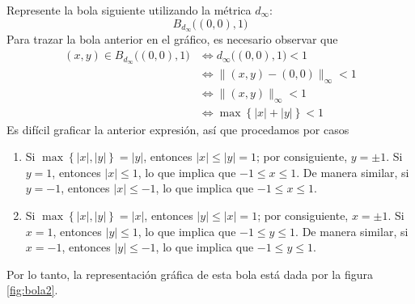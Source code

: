 \begin{example}
    Represente la bola siguiente utilizando la métrica $d_{\infty}$:
    $$B_{d_{\infty}} \big( (0, 0), 1 \big)$$\newpage{}
    \solucion Para trazar la bola anterior en el gráfico, es necesario observar que
    \begin{align*}
        (x, y) \in B_{d_{\infty}} \big( (0, 0), 1 \big) & \Longleftrightarrow d_{\infty} \big( (0, 0), 1 \big) < 1 \\
        & \Longleftrightarrow \| (x, y) - (0, 0) \|_{\infty} < 1 \\
        & \Longleftrightarrow \| (x, y) \|_{\infty} < 1 \\
        & \Longleftrightarrow \max \left\{ |x| + |y| \right\} < 1
    \end{align*}
    Es difícil graficar la anterior expresión, así que procedamos por casos
    \begin{enumerate}[label=\roman*)]
        \item Si $\max \left\{ |x|, |y| \right\} = |y|$, entonces $|x| \leq |y| = 1$; por consiguiente, $y = \pm 1$. Si $y = 1$, entonces $|x| \leq 1$, lo que implica que $-1 \leq x \leq 1$. De manera similar, si $y = -1$, entonces $|x| \leq -1$, lo que implica que $-1 \leq x \leq 1$.
        \item Si $\max \left\{ |x|, |y| \right\} = |x|$, entonces $|y| \leq |x| = 1$; por consiguiente, $x = \pm 1$. Si $x = 1$, entonces $|y| \leq 1$, lo que implica que $-1 \leq y \leq 1$. De manera similar, si $x = -1$, entonces $|y| \leq -1$, lo que implica que $-1 \leq y \leq 1$.
    \end{enumerate}
    Por lo tanto, la representación gráfica de esta bola está dada por la figura \ref{fig:bola2}.
\end{example}

